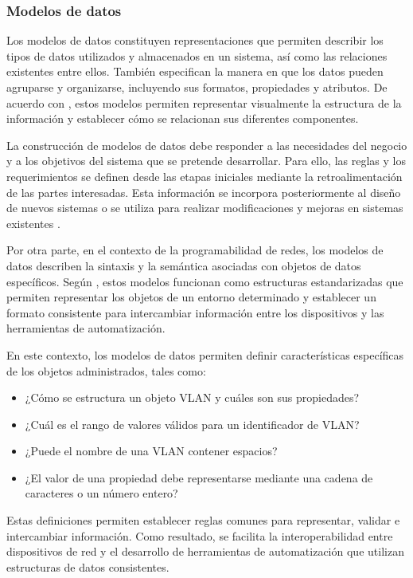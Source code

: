 \documentclass[12pt,a4paper]{article}
\begin{document}
\subsubsection{Modelos de datos}

Los modelos de datos constituyen representaciones que permiten describir los tipos de datos utilizados y almacenados en un sistema, así como las relaciones existentes entre ellos. También especifican la manera en que los datos pueden agruparse y organizarse, incluyendo sus formatos, propiedades y atributos. De acuerdo con \textcite{ibm2026}, estos modelos permiten representar visualmente la estructura de la información y establecer cómo se relacionan sus diferentes componentes.

La construcción de modelos de datos debe responder a las necesidades del negocio y a los objetivos del sistema que se pretende desarrollar. Para ello, las reglas y los requerimientos se definen desde las etapas iniciales mediante la retroalimentación de las partes interesadas. Esta información se incorpora posteriormente al diseño de nuevos sistemas o se utiliza para realizar modificaciones y mejoras en sistemas existentes \parencite{ibm2026}.

Por otra parte, en el contexto de la programabilidad de redes, los modelos de datos describen la sintaxis y la semántica asociadas con objetos de datos específicos. Según \textcite{nguyen2023}, estos modelos funcionan como estructuras estandarizadas que permiten representar los objetos de un entorno determinado y establecer un formato consistente para intercambiar información entre los dispositivos y las herramientas de automatización.

En este contexto, los modelos de datos permiten definir características específicas de los objetos administrados, tales como:

\begin{itemize}
    \item ¿Cómo se estructura un objeto VLAN y cuáles son sus propiedades?
    \item ¿Cuál es el rango de valores válidos para un identificador de VLAN?
    \item ¿Puede el nombre de una VLAN contener espacios?
    \item ¿El valor de una propiedad debe representarse mediante una cadena de caracteres o un número entero?
\end{itemize}

Estas definiciones permiten establecer reglas comunes para representar, validar e intercambiar información. Como resultado, se facilita la interoperabilidad entre dispositivos de red y el desarrollo de herramientas de automatización que utilizan estructuras de datos consistentes.
\end{document}
